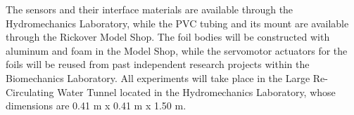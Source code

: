     The sensors and their interface materials are available through the Hydromechanics Laboratory, while the PVC tubing and its mount are available through the Rickover Model Shop. The foil bodies will be constructed with aluminum and foam in the Model Shop, while the servomotor actuators for the foils will be reused from past independent research projects within the Biomechanics Laboratory. All experiments will take place in the Large Re-Circulating Water Tunnel located in the Hydromechanics Laboratory, whose dimensions are 0.41 m x 0.41 m x 1.50 m.
    

